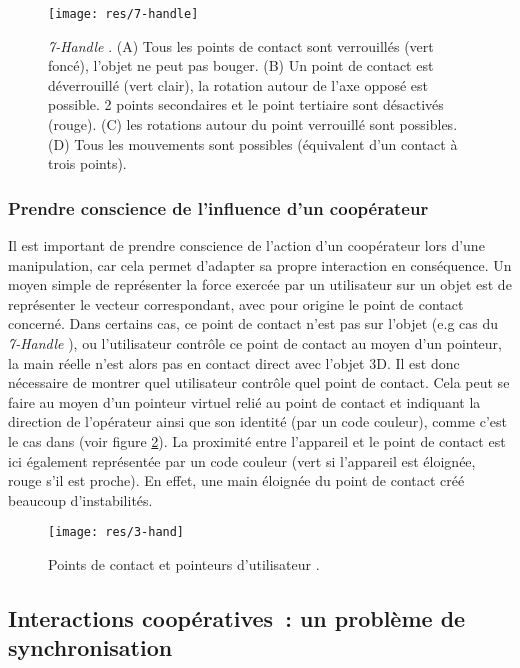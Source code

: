 \documentclass[11pt]{article}
\begin{document}
\begin{figure}
\centering
\texttt{[image: res/7-handle]}
\caption{\label{fig:7-handler}\textit{7-Handle} \cite{thesis}. (A) Tous les points de contact sont verrouillés (vert foncé), l'objet ne peut pas bouger. (B) Un point de contact est déverrouillé (vert clair), la rotation autour de l'axe opposé est possible. 2 points secondaires et le point tertiaire sont désactivés (rouge). (C) les rotations autour du point verrouillé sont possibles. (D) Tous les mouvements sont possibles (équivalent d'un contact à trois points).}
\end{figure}

\subsubsection{Prendre conscience de l'influence d'un coopérateur}
Il est important de prendre conscience de l'action d'un coopérateur lors d'une manipulation, car cela permet d'adapter sa propre interaction en conséquence. Un moyen simple de représenter la force exercée par un utilisateur sur un objet est de représenter le vecteur correspondant, avec pour origine le point de contact concerné. Dans certains cas, ce point de contact n'est pas sur l'objet (e.g cas du \textit{7-Handle} \cite{thesis}), ou l'utilisateur contr\^ole ce point de contact au moyen d'un pointeur, la main réelle n'est alors pas en contact direct avec l'objet 3D. Il est donc nécessaire de montrer quel utilisateur contr\^ole quel point de contact. Cela peut se faire au moyen d'un pointeur virtuel relié au point de contact et indiquant la direction de l'opérateur ainsi que son identité (par un code couleur), comme c'est le cas dans \cite{3-hand} (voir figure \ref{fig:3-hand}). La proximité entre l'appareil et le point de contact est ici également représentée par un code couleur (vert si l'appareil est éloignée, rouge s'il est proche). En effet, une main éloignée du point de contact créé beaucoup d'instabilités. 

\begin{figure}
\centering
\texttt{[image: res/3-hand]}
\caption{\label{fig:3-hand}Points de contact et pointeurs d'utilisateur \cite{3-hand}.}
\end{figure}

\subsection{Interactions coopératives~: un problème de synchronisation}
\end{document}
